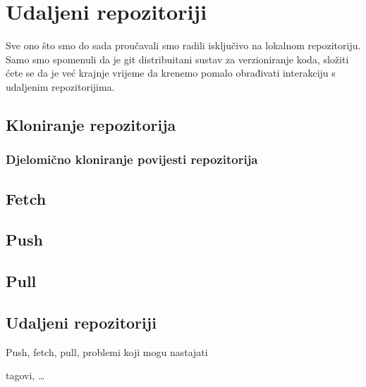 \chapter*{Udaljeni repozitoriji}

Sve ono što smo do sada proučavali smo radili isključivo na lokalnom repozitoriju.
Samo smo spomenuli da je git distribuitani sustav za verzioniranje koda, složiti ćete se da je već krajnje vrijeme da krenemo pomalo obrađivati interakciju s udaljenim repozitorijima.

\section*{Kloniranje repozitorija}

\subsection*{Djelomično kloniranje povijesti repozitorija}

\section*{Fetch}

\section*{Push}

\section*{Pull}

\section*{Udaljeni repozitoriji}

Push, fetch, pull, problemi koji mogu nastajati

tagovi, \dots


